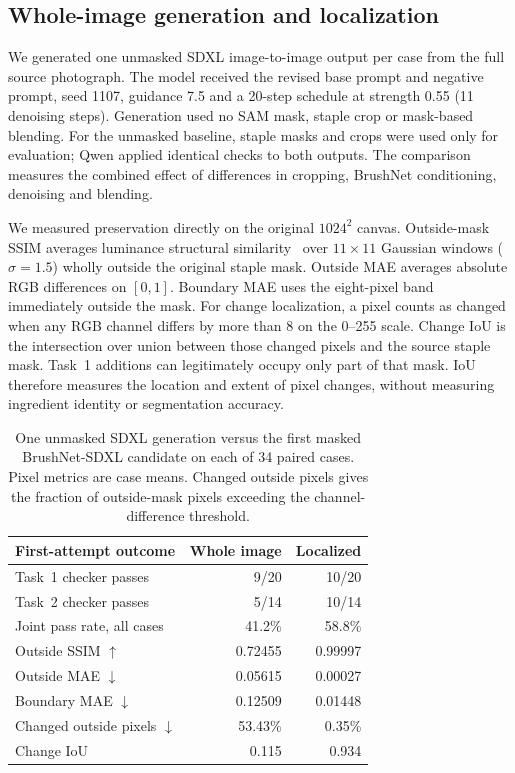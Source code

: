 \subsection{Whole-image generation and localization}

We generated one unmasked SDXL image-to-image output per case from the full source photograph. The model received the revised base prompt and negative prompt, seed 1107, guidance 7.5 and a 20-step schedule at strength 0.55 (11 denoising steps). Generation used no SAM mask, staple crop or mask-based blending. For the unmasked baseline, staple masks and crops were used only for evaluation; Qwen applied identical checks to both outputs. The comparison measures the combined effect of differences in cropping, BrushNet conditioning, denoising and blending.

We measured preservation directly on the original $1024^2$ canvas. Outside-mask SSIM averages luminance structural similarity~\cite{wang2004ssim} over $11\times11$ Gaussian windows ($\sigma=1.5$) wholly outside the original staple mask. Outside MAE averages absolute RGB differences on $[0,1]$. Boundary MAE uses the eight-pixel band immediately outside the mask. For change localization, a pixel counts as changed when any RGB channel differs by more than 8 on the 0--255 scale. Change IoU is the intersection over union between those changed pixels and the source staple mask. Task~1 additions can legitimately occupy only part of that mask. IoU therefore measures the location and extent of pixel changes, without measuring ingredient identity or segmentation accuracy.

\begin{table}[t]
\centering\small
\begin{tabular}{@{}lrr@{}}\toprule
First-attempt outcome & Whole image & Localized\\\midrule
Task~1 checker passes & 9/20 & 10/20\\
Task~2 checker passes & 5/14 & 10/14\\
Joint pass rate, all cases & 41.2\% & 58.8\%\\\midrule
Outside SSIM $\uparrow$ & 0.72455 & 0.99997\\
Outside MAE $\downarrow$ & 0.05615 & 0.00027\\
Boundary MAE $\downarrow$ & 0.12509 & 0.01448\\
Changed outside pixels $\downarrow$ & 53.43\% & 0.35\%\\
Change IoU & 0.115 & 0.934\\\bottomrule
\end{tabular}
\caption{One unmasked SDXL generation versus the first masked BrushNet-SDXL candidate on each of 34 paired cases. Pixel metrics are case means. Changed outside pixels gives the fraction of outside-mask pixels exceeding the channel-difference threshold.}\label{tab:outside}
\end{table}

